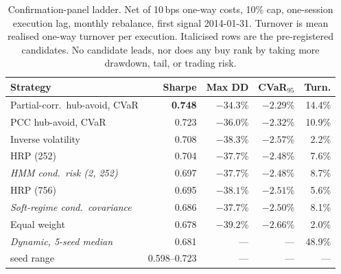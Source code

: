 \begin{table}[t]
\centering
\caption{Confirmation-panel ladder. Net of 10\,bps one-way costs, 10\% cap,
one-session execution lag, monthly rebalance, first signal 2014-01-31.
Turnover is mean realised one-way turnover per execution. Italicised rows
are the pre-registered candidates. No candidate leads, nor does any buy rank
by taking more drawdown, tail, or trading risk.}
\label{tab:confirmation}
\footnotesize
\begin{tabular}{lrrrr}
\toprule
Strategy & Sharpe & Max DD & CVaR$_{95}$ & Turn. \\
\midrule
Partial-corr.\ hub-avoid, CVaR & \textbf{0.748} & $-34.3$\% & $-2.29$\% & 14.4\% \\
PCC hub-avoid, CVaR & 0.723 & $-36.0$\% & $-2.32$\% & 10.9\% \\
Inverse volatility & 0.708 & $-38.3$\% & $-2.57$\% & 2.2\% \\
HRP (252) & 0.704 & $-37.7$\% & $-2.48$\% & 7.6\% \\
\emph{HMM cond.\ risk (2, 252)} & 0.697 & $-37.7$\% & $-2.48$\% & 8.7\% \\
HRP (756) & 0.695 & $-38.1$\% & $-2.51$\% & 5.6\% \\
\emph{Soft-regime cond.\ covariance} & 0.686 & $-37.7$\% & $-2.50$\% & 8.1\% \\
Equal weight & 0.678 & $-39.2$\% & $-2.66$\% & 2.0\% \\
\midrule
\emph{Dynamic, 5-seed median} & 0.681 & --- & --- & 48.9\% \\
\quad seed range & 0.598--0.723 & --- & --- & --- \\
\bottomrule
\end{tabular}
\end{table}
